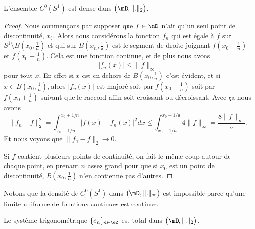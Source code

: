\begin{lemma}   \label{LemVIwMsTC}
    L'ensemble \( C^0(S^1)\) est dense dans \( \big( \mD,\| . \|_2 \big)\).
\end{lemma}

\begin{proof}
    Nous commençons par supposer que \( f\in\mD\) n'ait qu'un seul point de discontinuité, \( x_0\). Alors nous considérons la fonction \( f_n\) qui est égale à \( f\) sur \( S^1\setminus B(x_0,\frac{1}{ n })\) et qui sur \( B(x_n,\frac{1}{ n })\) est le segment de droite joignant \( f(x_0-\frac{1}{ n })\) et \( f(x_0+\frac{1}{ n })\). Cela est une fonction continue, et de plus nous avons
    \begin{equation}
        | f_n(x) |\leq \| f \|_{\infty}
    \end{equation}
    pour tout \( x\). En effet si \( x\) est en dehors de \( B(x_0,\frac{1}{ n })\) c'est évident, et si \( x\in B(x_0,\frac{1}{ n })\), alors \( | f_n(x) |\) est majoré soit par \( f(x_0-\frac{1}{ n })\) soit par \( f(x_0+\frac{1}{ n })\) suivant que le raccord affin soit croissant ou décroissant. Avec ça nous avons
    \begin{equation}
        \| f_n-f \|_2^2=\int_{x_0-1/n}^{x_0+1/n}| f(x)-f_n(x) |^2dx\leq \int_{x_0-1/n}^{x_0+1/n}4\| f \|_{\infty}=\frac{ 8\| f \|_{\infty} }{ n }.
    \end{equation}
    Et nous voyons que \( \| f_n-f \|_2\to 0\).

    Si \( f\) contient plusieurs points de continuité, on fait le même coup autour de chaque point, en prenant \( n\) assez grand pour que si \( x_0\) est un point de discontinuité, \( B(x_0,\frac{1}{ n })\) n'en contienne pas d'autres.
\end{proof}

Notons que la densité de \( C^0(S^1)\) dans \( \big( \mD,\| . \|_{\infty} \big)\) est impossible parce qu'une limite uniforme de fonctions continues est continue.

\begin{theorem}
    Le système trigonométrique \( \{ e_n \}_{n\in \eZ}\) est total dans \( \big( \mD,\| . \|_2 \big)\).
\end{theorem}

